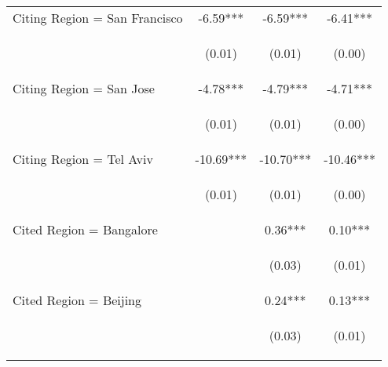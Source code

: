\begin{center}
\begin{tabular}{lccc}
Citing Region = San Francisco & -6.59*** & -6.59*** & -6.41*** \\
\vspace{4pt} & \begin{footnotesize}(0.01)\end{footnotesize} & \begin{footnotesize}(0.01)\end{footnotesize} & \begin{footnotesize}(0.00)\end{footnotesize} \\
Citing Region = San Jose & -4.78*** & -4.79*** & -4.71*** \\
\vspace{4pt} & \begin{footnotesize}(0.01)\end{footnotesize} & \begin{footnotesize}(0.01)\end{footnotesize} & \begin{footnotesize}(0.00)\end{footnotesize} \\
Citing Region = Tel Aviv & -10.69*** & -10.70*** & -10.46*** \\
\vspace{4pt} & \begin{footnotesize}(0.01)\end{footnotesize} & \begin{footnotesize}(0.01)\end{footnotesize} & \begin{footnotesize}(0.00)\end{footnotesize} \\
Cited Region = Bangalore &  & 0.36*** & 0.10*** \\
\vspace{4pt} & \begin{footnotesize}\end{footnotesize} & \begin{footnotesize}(0.03)\end{footnotesize} & \begin{footnotesize}(0.01)\end{footnotesize} \\
Cited Region = Beijing &  & 0.24*** & 0.13*** \\
\vspace{4pt} & \begin{footnotesize}\end{footnotesize} & \begin{footnotesize}(0.03)\end{footnotesize} & \begin{footnotesize}(0.01)\end{footnotesize} \\

\end{tabular}
\end{center}
